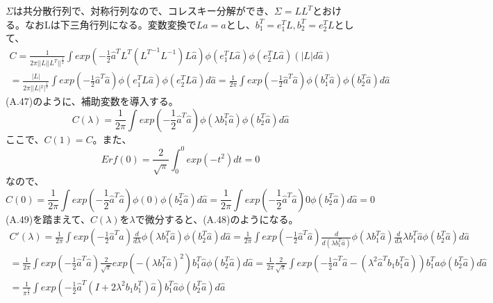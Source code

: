 \documentclass{jsarticle}
\begin{document}
$\Sigma$は共分散行列で、対称行列なので、コレスキー分解ができ、$\Sigma = L L^T$とおける。なおLは下三角行列になる。変数変換で$L\hat{a} = a$とし、$b_1^T = e_1^T L, b_2^T = e_2^T L$として、
\begin{equation}
\begin{split}
C = \frac{1}{2\pi ||L||L^T||^{\frac{1}{2}}} \int exp(-\frac{1}{2} \hat{a}^T L^T ({L^T}^{-1} L^{-1}) L \hat{a}) \phi(e_1^T L\hat{a})\phi(e_2^T L\hat{a}) (|L| d\hat{a})\\
= \frac{|L|}{2\pi ||L|^2|^{\frac{1}{2}}} \int exp(-\frac{1}{2} \hat{a}^T \hat{a}) \phi(e_1^T L\hat{a})\phi(e_2^T L\hat{a}) d\hat{a}
= \frac{1}{2\pi} \int exp(-\frac{1}{2} \hat{a}^T \hat{a}) \phi(b_1^T \hat{a})\phi(b_2^T \hat{a}) d\hat{a}
\end{split}
\end{equation}
(A.47)のように、補助変数を導入する。
\begin{equation}
C(\lambda) = \frac{1}{2\pi} \int exp(-\frac{1}{2} \hat{a}^T \hat{a}) \phi(\lambda b_1^T \hat{a})\phi(b_2^T \hat{a}) d\hat{a}
\end{equation}
ここで、$C(1) = C$。また、
\begin{equation}
Erf(0) = \frac{2}{\sqrt{\pi}} \int_0^0 exp(-t^2)dt = 0
\end{equation}
なので、
\begin{equation}
C(0) = \frac{1}{2\pi} \int exp(-\frac{1}{2} \hat{a}^T \hat{a}) \phi(0)\phi(b_2^T \hat{a}) d\hat{a}
= \frac{1}{2\pi} \int exp(-\frac{1}{2} \hat{a}^T \hat{a}) 0 \phi(b_2^T \hat{a}) d\hat{a}
= 0
\end{equation}
(A.49)を踏まえて、$C(\lambda)$を$\lambda$で微分すると、(A.48)のようになる。
\begin{equation}
\begin{split}
C'(\lambda) = \frac{1}{2\pi} \int exp(-\frac{1}{2} \hat{a}^T \hat{a}) \frac{d}{d\lambda}\phi(\lambda b_1^T \hat{a})\phi(b_2^T \hat{a}) d\hat{a}
= \frac{1}{2\pi} \int exp(-\frac{1}{2} \hat{a}^T \hat{a}) \frac{d}{d (\lambda b_1^T \hat{a})}\phi(\lambda b_1^T \hat{a}) \frac{d}{d \lambda}  \lambda b_1^T \hat{a} \phi(b_2^T \hat{a}) d\hat{a}\\
= \frac{1}{2\pi} \int exp(-\frac{1}{2} \hat{a}^T \hat{a}) \frac{2}{\sqrt{\pi}}exp(-(\lambda b_1^T \hat{a})^2) b_1^T \hat{a} \phi(b_2^T \hat{a}) d\hat{a}
= \frac{1}{2\pi} \frac{2}{\sqrt{\pi}} \int exp(-\frac{1}{2} \hat{a}^T \hat{a} - (\lambda^2 \hat{a}^T b_1 b_1^T \hat{a})) b_1^T \hat{a} \phi(b_2^T \hat{a}) d\hat{a}\\
= \frac{1}{{\pi}^{\frac{3}{2}}} \int exp(-\frac{1}{2} \hat{a}^T (I + 2\lambda^2 b_1 b_1^T) \hat{a}) b_1^T \hat{a} \phi(b_2^T \hat{a}) d\hat{a}
\end{split}
\end{equation}
\end{document}
